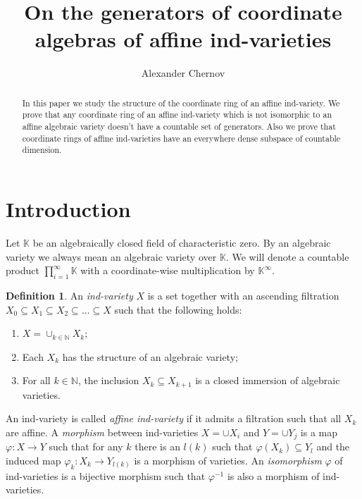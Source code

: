 \documentclass[a4paper,draft,reqno,12pt]{amsart}
\title{On the generators of coordinate algebras of affine ind-varieties}
\author{Alexander Chernov}
\theoremstyle{definition}
\newtheorem{definition}{Definition}
\theoremstyle{remark}
\def\BK{{\mathbb K}}
\def\BK{{\mathbb K}}
\def\BN{{\mathbb N}}
\begin{document}
\maketitle

\thispagestyle{empty}
\begin{abstract}
In this paper we study the structure of the coordinate ring of an affine ind-variety. We prove that any coordinate ring of an affine ind-variety which is not isomorphic to an affine algebraic variety doesn't have a countable set of generators. Also we prove that coordinate rings of affine ind-varieties have an everywhere dense subspace of countable dimension.
\end{abstract}

\section{Introduction}

Let $\BK$ be an algebraically closed field of characteristic zero. By an algebraic variety we always mean an algebraic variety over $\BK$. We will denote a countable product $\prod_{i = 1}^{\infty}\BK$ with a coordinate-wise multiplication by $\BK^{\infty}$.

\begin{definition}\cite[Definition 1.1.1]{FK}
    An \emph{ind-variety} $X$ is a set together with an ascending filtration $X_0 \subseteq X_1 \subseteq X_2 \subseteq \dotsc \subseteq X$ such that the following holds: \begin{enumerate}
        \item $X = \cup_{k\in \BN}X_k$;
        \item Each $X_k$ has the structure of an algebraic variety;
        \item For all $k \in \BN$, the inclusion $X_k \subseteq X_{k+1}$ is a closed immersion of algebraic varieties.
    \end{enumerate}
    An ind-variety is called \emph{affine ind-variety} if it admits a filtration such that all $X_k$ are affine. A \emph{morphism} between ind-varieties $X = \cup X_i$ and $Y = \cup Y_j$ is a map $\varphi: X \to Y$ such that for any $k$ there is an $l(k)$ such that $\varphi(X_k) \subseteq Y_l$ and the induced map $\varphi_{k}: X_k \to Y_{l(k)}$ is a morphism of varieties. An \emph{isomorphism} $\varphi$ of ind-varieties is a bijective morphism such that $\varphi^{-1}$ is also a morphism of ind-varieties.
\end{definition}
\end{document}

